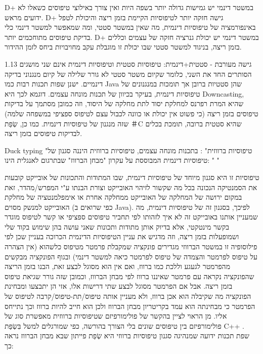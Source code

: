       D+ במשטר דינמי יש גמישות גדולה יותר בשפה היות ואין צורך באילוצי טיפוסים כשאלו לא ידועים מראש.
      D+ גישה חזקה יותר לטיפוסיות הקיימת בזמן ריצה והיכולת לטפל באינפורמציה של טיפוסיות דינמית, מה שאין במשטר סטטי, ומה שמאפשר למשטר דינמי כלי בדיקת טיפוסים מתוחכמים יותר.
      D+ במשטר דינמי יש יכולת גנרציה חזקה של עצמים וכללים בזמן ריצה, בניגוד למשטר סטטי שבו יכולת זו מוגבלת עקב מחויבויות ביחס לזמן ההידור.

      1.13 גישה מעורבת - סטטית+דינמית:
      טיפוסיות סטטית וטיפוסיות דינמית אינם שני מושגים הסותרים החד את השני, כלומר שקיום משטר סטטי לא גורר שלילה של קיום מנגנוני בדיקה דינמיים.
      ישנן שפות תכנות רבות כמו Java שהן סטטיות ברובן אך תומכות במנגנונים של טיפוסיות דינמית, בעיקר בכיוון של תכנות מונחה עצמים. דוגמא לכך היא Downcasting, שהיא המרת רפרנס למחלקת יסוד לתת מחלקה של היסוד, וזה כמובן מסתמך על בדיקות טיפוסים בזמן ריצה (כי פשוט אין יכולת או כוונה לכבול עצם לטיפוס ספציפי במשפחה שלמה) שזה מנגנון של טיפוסיות דינמית.
      כמו כן, שְׂפַת ＃C שהיא סטטית ברובה, תומכת בכלים לבדיקות טיפוסים בזמן ריצה.

      Duck typing "טיפוסיות ברווזית" :
      בתכנות מונחה עצמים, טיפוסיות ברווזית היננה סגנון של טיפוסיות דינמית המבוססת על עקרון "מבחן הברווז" שבתרגום לאנגלית הינו:
      " "

      טיפוסיות זו היא סגנון מיוחד של טיפוסיות דינמית, שבו המתודות והתכונות של אובייקט
      קובעות את הסמנטיקה הנכונה בכל מה שקשור לזיהוי האובייקט וצורת הבנתו ע"י
      המפרש/מהדר, זאת במקום ירושה של המחלקה של האובייקט ממחלקה אחרת או אימפלמנטציה של
      מחלקת האובייקט למנשק מסוים (כפי שרואים ב Java). לפיכך, בסגנון זה של טיפוסיות
      דינמית, מה שמעניין אותנו באובייקט זה לא איך לזהותו לפי תחביר טיפוסים ספציפי או
      קשר לטיפוס מוגדר בקשר מינטקטי, אלא בדיוק אותן מתודות ותכונות שאני עושה בהן
      שימוש בקוד שלי ושמופעלות בזמן ריצה, וזה מדגיש את עניין הטיפוסיות הדינמית הכרוכה
      בעניין שכן לפי פילוסופיה זו במשטר הברווזי מגדירים פונקציה שמקבלת פרמטר מטיפוס
      כלשהוא (אין הצהרה על טיפוס לפרמטר והצמדה של טיפוס לפרמטר כיאה למשטר דינמי)
      ובגוף הפונקציה מבקשים מהפרמטר לגעגע וללכת כמו ברווז, ואם אין הוא מסוגל לבצע
      זאת, הבנו בזמן הריצה שהפונקציה נקראה עם פרמטר שאיננו ברווז לפי מבחן הברווז,
      וכמובן שזה גורר שגיאת טיפוס בזמן ריצה. אבל אם הפרמטר מסוגל לבצע שתי דרישות אלו,
      אזי הן יתבצעו ומבחינת הפונקציה מה שקיבלה הוא אכן ברווז, ולא מעניין אותה
      טיפוס/תת-טיפוס/קרבה לטיפוס של הפרמטר כי מבחינתה הוא עמד בקריטריון מבחן הברווז
      ולכן הוא חייב להיות ברווז וכך נתייחס אליו. מן הראוי לציין בהקשר של פולימורפיזם
      שטיפוסיות ברווזית מאפשרת סוג של פולימורפיזם בין טיפוסים שונים בלי הצורך בהורשה,
      כפי שמורגלים למשל בִּשְׂפַת C++ . שפת תכנות ידועה שמנהיגה סגנון טיפוסיות ברווזי היא
      שְׂפַת פייתון \Python שבא מבחן הברווז נראה כך:

